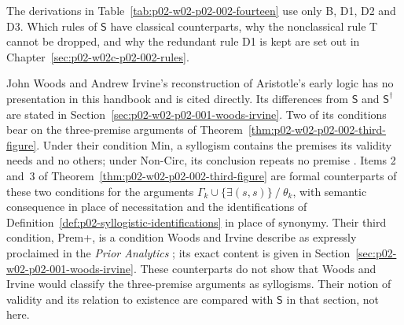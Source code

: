 The derivations in Table~\ref{tab:p02-w02-p02-002-fourteen} use only B, D1,
D2 and D3. Which rules of \(\mathsf S\) have classical counterparts, why the
nonclassical rule T cannot be dropped, and why the redundant rule D1 is kept
are set out in Chapter~\ref{sec:p02-w02c-p02-002-rules}.

John Woods and Andrew Irvine's reconstruction of Aristotle's early logic
\cite[pp.~27--99]{WoodsIrvine2004EarlyLogic} has no presentation in this
handbook and is cited directly. Its differences from \(\mathsf S\) and
\(\mathsf S^\dagger\) are stated in
Section~\ref{sec:p02-w02-p02-001-woods-irvine}. Two of its conditions bear
on the three-premise arguments of
Theorem~\ref{thm:p02-w02-p02-002-third-figure}. Under their condition Min,
a syllogism contains the premises its validity needs and no others; under
Non-Circ, its conclusion repeats no premise
\cite[p.~54]{WoodsIrvine2004EarlyLogic}. Items 2 and~3 of
Theorem~\ref{thm:p02-w02-p02-002-third-figure} are formal counterparts of
these two conditions for the arguments
\(\Gamma_k\cup\{\exists(s,s)\}\mathbin{/}\theta_k\), with semantic
consequence in place of necessitation and the identifications of
Definition~\ref{def:p02-syllogistic-identifications} in place of
synonymy. Their third condition, Prem+, is a condition Woods and Irvine describe
as expressly proclaimed in the \emph{Prior Analytics}
\cite[p.~63]{WoodsIrvine2004EarlyLogic}; its exact content is given in
Section~\ref{sec:p02-w02-p02-001-woods-irvine}. These counterparts do not
show that Woods and Irvine would classify the three-premise arguments as
syllogisms. Their notion of validity and its relation to existence are
compared with \(\mathsf S\) in that section, not here.

